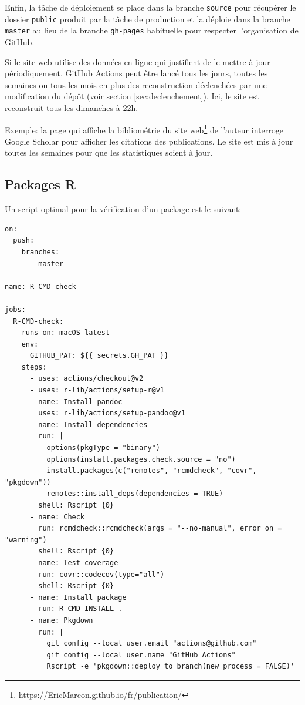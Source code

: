 \documentclass[
  12pt,
  french,
  a4paper,
  extrafontsizes,onecolumn,openright
  ]{memoir}
\begin{document}
Enfin, la tâche de déploiement se place dans la branche \texttt{source} pour récupérer le dossier \texttt{public} produit par la tâche de production et la déploie dans la branche \texttt{master} au lieu de la branche \texttt{gh-pages} habituelle pour respecter l'organisation de GitHub.

Si le site web utilise des données en ligne qui justifient de le mettre à jour périodiquement, GitHub Actions peut être lancé tous les jours, toutes les semaines ou tous les mois en plus des reconstruction déclenchées par une modification du dépôt (voir section \ref{sec:declenchement}).
Ici, le site est reconstruit tous les dimanches à 22h.

Exemple: la page qui affiche la bibliométrie du site web\footnote{\url{https://EricMarcon.github.io/fr/publication/}} de l'auteur interroge Google Scholar pour afficher les citations des publications.
Le site est mis à jour toutes les semaines pour que les statistiques soient à jour.

\hypertarget{sec:package-ci6}{%
\subsection{Packages R}\label{sec:package-ci6}}

Un script optimal pour la vérification d'un package est le suivant:

\begin{verbatim}
on:
  push:
    branches:
      - master

name: R-CMD-check

jobs:
  R-CMD-check:
    runs-on: macOS-latest
    env:
      GITHUB_PAT: ${{ secrets.GH_PAT }}
    steps:
      - uses: actions/checkout@v2
      - uses: r-lib/actions/setup-r@v1
      - name: Install pandoc
        uses: r-lib/actions/setup-pandoc@v1
      - name: Install dependencies
        run: |
          options(pkgType = "binary")
          options(install.packages.check.source = "no")
          install.packages(c("remotes", "rcmdcheck", "covr", "pkgdown"))
          remotes::install_deps(dependencies = TRUE)
        shell: Rscript {0}
      - name: Check
        run: rcmdcheck::rcmdcheck(args = "--no-manual", error_on = "warning")
        shell: Rscript {0}
      - name: Test coverage
        run: covr::codecov(type="all")
        shell: Rscript {0}
      - name: Install package
        run: R CMD INSTALL .
      - name: Pkgdown
        run: |
          git config --local user.email "actions@github.com"
          git config --local user.name "GitHub Actions"
          Rscript -e 'pkgdown::deploy_to_branch(new_process = FALSE)'
\end{verbatim}
\end{document}
